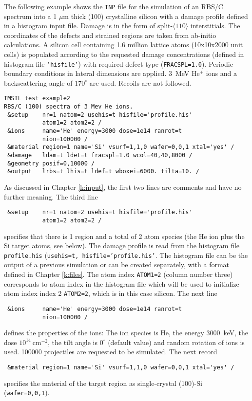 The following example shows the \texttt{INP} file for the simulation of an
RBS/C spectrum into a 1 $\mu$m thick (100) crystalline silicon with a damage
profile defined in a histogram input file. Damage is in the form of
split-$\langle 110 \rangle$ interstitials. The coordinates of the defects and
strained regions are taken from ab-initio calculations. A silicon cell
containing 1.6 million lattice atoms (10x10x2000 unit cells) is populated
according to the requested damage concentrations (defined in histogram file
\texttt{'hisfile'}) with required defect type (\texttt{FRACSPL=1.0}). Periodic
boundary conditions in lateral dimensions are applied. 3~MeV He$^+$ ions and a
backscattering angle of $170^\circ$ are used.  Recoils are not followed.

\begin{verbatim}
IMSIL test example2
RBS/C (100) spectra of 3 Mev He ions. 
 &setup    nr=1 natom=2 usehis=t hisfile='profile.his' 
           atom1=2 atom2=2 / 
 &ions     name='He' energy=3000 dose=1e14 ranrot=t 
           nion=100000 /
 &material region=1 name='Si' vsurf=1,1,0 wafer=0,0,1 xtal='yes' /
 &damage   ldam=t ldet=t fracspl=1.0 wcol=40,40,8000 /
 &geometry posif=0,10000 /
 &output   lrbs=t lhis=t ldef=t wboxei=6000. tilta=10. /
\end{verbatim}

As discussed in Chapter \ref{k:input}, the first two lines are comments and
have no further meaning. The third line
%
\begin{verbatim}
 &setup    nr=1 natom=2 usehis=t hisfile='profile.his' 
           atom1=2 atom2=2 / 
\end{verbatim}
%
specifies that there is 1 region and a total of 2 atom species (the He ion
plus the Si target atoms, see below).  The damage profile is read from the
histogram file \texttt{profile.his} (\texttt{usehis=t, hisfile='profile.his'}.
The histogram file can be the output of a previous simulation or can be
created separately, with a format defined in Chapter \ref{k:files}. The atom
index \texttt{ATOM1=2} (column number three) corresponds to atom index in the
histogram file which will be used to initialize atom index index 2
\texttt{ATOM2=2}, which is in this case silicon. The next line
%
\begin{verbatim}
 &ions     name='He' energy=3000 dose=1e14 ranrot=t
           nion=100000 /
\end{verbatim}
%
defines the properties of the ions: The ion species is He, the energy
3000~keV, the dose $10^{14}~$cm$^{-2}$, the tilt angle is $0^\circ$ (default
value) and random rotation of ions is used. 100000 projectiles are requested
to be simulated.  The next record
%
\begin{verbatim}
 &material region=1 name='Si' vsurf=1,1,0 wafer=0,0,1 xtal='yes' /
\end{verbatim}
%
specifies the material of the target region as single-crystal (100)-Si 
(\texttt{wafer=0,0,1}).

